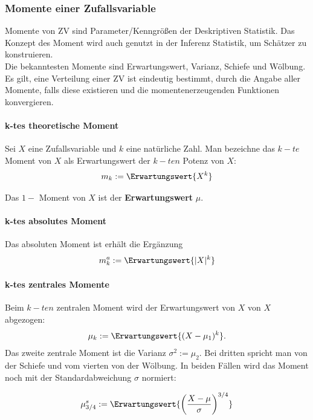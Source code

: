 \subsubsection{Momente einer Zufallsvariable}
Momente von \gls{ZV} sind Parameter/Kenngrößen der Deskriptiven Statistik. Das Konzept des Moment wird auch genutzt in der Inferenz Statistik, um Schätzer zu konstruieren. \\
Die bekanntesten Momente sind Erwartungswert, Varianz, Schiefe und Wölbung. Es gilt, eine Verteilung einer \gls{ZV} ist eindeutig bestimmt, durch die Angabe aller Momente, falls diese existieren und die momentenerzeugenden Funktionen konvergieren.\\


\paragraph{k-tes theoretische Moment}
Sei $X$ eine Zufallsvariable und $k$ eine natürliche Zahl. Man bezeichne das $k-te$ Moment von $X$ als Erwartungswert der $k-ten$ Potenz von $X$:
\begin{align}
	m_k := \Erwartungswert{X^k}
\end{align}

Das $1-$ Moment von $X$ ist der \textbf{Erwartungswert} $\mu$.

\paragraph{k-tes absolutes Moment}
Das absoluten Moment ist erhält die Ergänzung
\begin{align}
	m_k^a := \Erwartungswert{\lvert X \rvert^k}
\end{align}

\paragraph{k-tes zentrales Momente}

Beim $k-ten$ zentralen Moment wird der Erwartungswert von $X$ von $X$ abgezogen:
\begin{align}
	\mu_k := \Erwartungswert{(X - \mu_1)^k}.
\end{align}
Das zweite zentrale Moment ist die Varianz $\sigma^2 := \mu_2$. Bei dritten spricht man von der Schiefe und vom vierten von der Wölbung. In beiden Fällen wird das Moment noch mit der Standardabweichung $\sigma$ normiert:

\begin{align}
	\mu_{3/4}^s := \Erwartungswert{\left(\frac{X- \mu}{\sigma}\right)^{3/4}}
\end{align}


